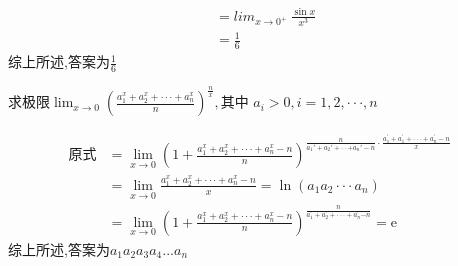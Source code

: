 \documentclass[12pt, a4paper, oneside, UTF8]{ctexbook}  %
\begin{document}
\begin{sloppypar}
\begin{itemize}
\begin{solution}
\begin{align*}
                                & = {lim}_{x\to0^+}\ \frac{\sin x}{x^3}                                                     \\
                                & = \frac{1}{6}
                  \end{align*}
                  综上所述,答案为$\frac{1}{6}$
              \end{solution}
              \begin{problem}
              $\text{求极限}\lim_{x\to0}\left(\frac{a_1^x+a_2^x+\cdotp\cdotp\cdotp+a_n^x}n\right)^{\frac nx},\text{其中 }a_i>0,i=1,2,\cdotp\cdotp\cdotp,n$
              \end{problem}
              \begin{solution}
                  \begin{align*}
                      \text{原式} & = \lim_{x\to0}\left(1+\frac{a_1^x+a_2^x+\cdotp\cdotp\cdotp+a_n^x-n}n\right)^{\frac n{a_1'+a_2'+\cdotp\cdotp+a_n'-n}\cdot\frac{a_1^{\prime}+a_1^{\prime}+\cdotp\cdotp\cdotp+a_n^{\prime}-n}x} \\
                                & = \lim_{x\to0}\frac{a_1^x+a_2^x+\cdotp\cdotp\cdotp+a_n^x-n}x=\ln(a_1a_2\cdotp\cdotp\cdotp a_n)                                                                                               \\
                                & = \lim_{x\to0}\left(1+\frac{a_1^x+a_2^x+\cdot\cdot\cdot+a_n^x-n}n\right)^{\frac n{a_1^{\prime}+a_2^{\prime}+\cdot\cdot\cdot+a_n^{\prime}{-n}}}=\mathrm{e}
                  \end{align*}
                  综上所述,答案为$a_1a_2a_3a_4...a_n$
              \end{solution}
    \end{itemize}

\end{sloppypar}
\end{document}
